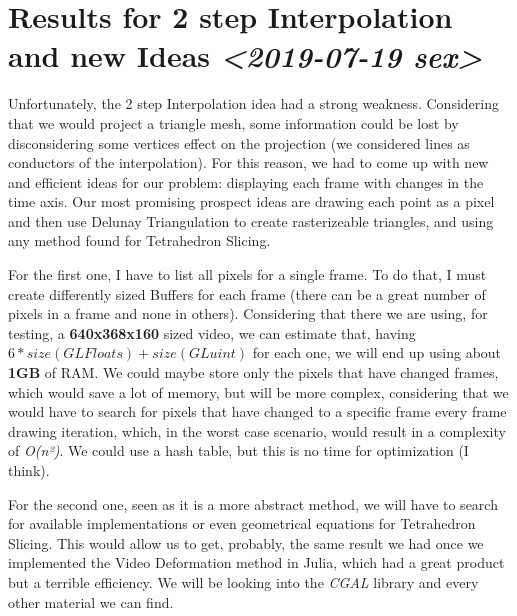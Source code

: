 \documentclass[11pt]{article}
\begin{document}
\section*{Results for 2 step Interpolation and new Ideas \textit{<2019-07-19 sex>}}
\label{sec:org0758676}

Unfortunately, the 2 step Interpolation idea had a strong weakness. Considering that we would project a triangle mesh, some information could be lost by disconsidering some vertices effect on the projection (we considered lines as conductors of the interpolation). For this reason, we had to come up with new and efficient ideas for our problem: displaying each frame with changes in the time axis. Our most promising prospect ideas are drawing each point as a pixel and then use Delunay Triangulation to create rasterizeable triangles, and using any method found for Tetrahedron Slicing.

For the first one, I have to list all pixels for a single frame. To do that, I must create differently sized Buffers for each frame (there can be a great number of pixels in a frame and none in others). Considering that there we are using, for testing, a \textbf{640x368x160} sized video, we can estimate that, having \(6 * size(GLFloats) + size(GLuint)\) for each one, we will end up using about \textbf{1GB} of RAM. We could maybe store only the pixels that have changed frames, which would save a lot of memory, but will be more complex, considering that we would have to search for pixels that have changed to a specific frame every frame drawing iteration, which, in the worst case scenario, would result in a complexity of \emph{O(n²)}. We could use a hash table, but this is no time for optimization (I think).

For the second one, seen as it is a more abstract method, we will have to search for available implementations or even geometrical equations for Tetrahedron Slicing. This would allow us to get, probably, the same result we had once we implemented the Video Deformation method in Julia, which had a great product but a terrible efficiency. We will be looking into the \emph{CGAL} library and every other material we can find.   
\end{document}
